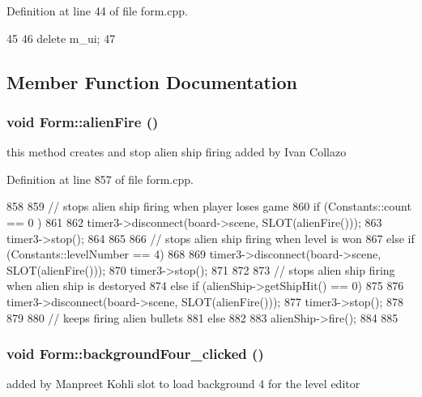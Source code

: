 Definition at line 44 of file form.cpp.


\begin{DoxyCode}
45 {
46     delete m_ui;
47 }
\end{DoxyCode}


\subsection{Member Function Documentation}
\hypertarget{class_form_ad699933c3ec2a35b96d9b0eb55c18c14}{
\subsubsection[{alienFire}]{\setlength{\rightskip}{0pt plus 5cm}void Form::alienFire ()}}
\label{class_form_ad699933c3ec2a35b96d9b0eb55c18c14}
this method creates and stop alien ship firing added by Ivan Collazo 

Definition at line 857 of file form.cpp.


\begin{DoxyCode}
858 {
859     // stops alien ship firing when player loses game
860     if (Constants::count == 0 )
861     {
862             timer3->disconnect(board->scene, SLOT(alienFire()));
863             timer3->stop();
864     }
865 
866     // stops alien ship firing when level is won
867     else if (Constants::levelNumber == 4)
868     {
869         timer3->disconnect(board->scene, SLOT(alienFire()));
870         timer3->stop();
871     }
872 
873     // stops alien ship firing when alien ship is destoryed
874     else if (alienShip->getShipHit() == 0)
875     {
876         timer3->disconnect(board->scene, SLOT(alienFire()));
877         timer3->stop();
878     }
879 
880     // keeps firing alien bullets
881     else
882     {
883         alienShip->fire();
884     }
885 }
\end{DoxyCode}
\hypertarget{class_form_af599736098aa8117bb52b18f7a661091}{
\subsubsection[{backgroundFour\_\-clicked}]{\setlength{\rightskip}{0pt plus 5cm}void Form::backgroundFour\_\-clicked ()}}
\label{class_form_af599736098aa8117bb52b18f7a661091}
added by Manpreet Kohli slot to load background 4 for the level editor 

